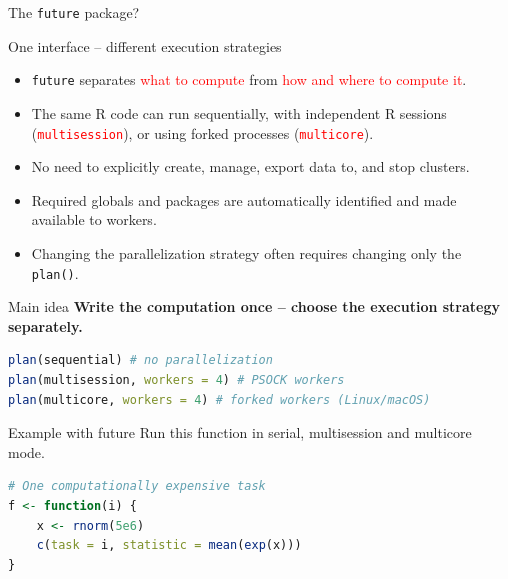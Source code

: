 \documentclass[compress,xcolor=table]{beamer}
\newcommand{\CoG}{\textcolor{red}}
\newcommand{\pp}{\pause}
\begin{document}
\begin{frame}[fragile]{The \texttt{future} package?} 
	\begin{block}{One interface -- different execution strategies} 
\footnotesize 
	\begin{itemize}
		\item \texttt{future} separates \CoG{what to compute} from \CoG{how and where to compute it}. 
		\item The same R code can run sequentially, with independent R sessions (\CoG{\texttt{multisession}}), or using forked processes (\CoG{\texttt{multicore}}). 
		\item No need to explicitly create, manage, export data to, and stop clusters. 
		\item Required globals and packages are automatically identified and made available to workers. 
		\item Changing the parallelization strategy often requires changing only the \texttt{plan()}. 
		\end{itemize} 
		\begin{alertblock}{Main idea} \centering \textbf{Write the computation once -- choose the execution strategy separately.} 
		\end{alertblock} 
\pp
		\begin{lstlisting}[language=R] 
plan(sequential) # no parallelization 
plan(multisession, workers = 4) # PSOCK workers 
plan(multicore, workers = 4) # forked workers (Linux/macOS) 
\end{lstlisting} 
\end{block} 
\end{frame}

\begin{frame}[fragile]{Example with future}
Run this function in serial, multisession and multicore mode.\\
	
\begin{lstlisting}[language=R]
# One computationally expensive task
f <- function(i) {
	x <- rnorm(5e6)
	c(task = i, statistic = mean(exp(x)))
}
\end{lstlisting}
\end{frame}
\end{document}
